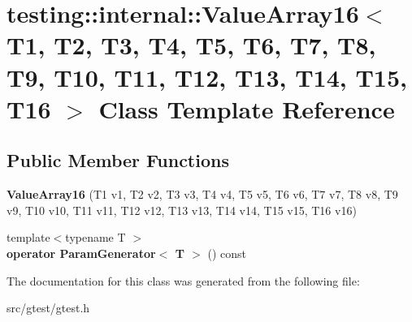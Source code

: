\hypertarget{classtesting_1_1internal_1_1_value_array16}{}\section{testing\+:\+:internal\+:\+:Value\+Array16$<$ T1, T2, T3, T4, T5, T6, T7, T8, T9, T10, T11, T12, T13, T14, T15, T16 $>$ Class Template Reference}
\label{classtesting_1_1internal_1_1_value_array16}
\subsection*{Public Member Functions}
\begin{DoxyCompactItemize}
\item 
\mbox{\label{classtesting_1_1internal_1_1_value_array16_ac12b3a15ab5418665a97b4a225438529}} 
{\bfseries Value\+Array16} (T1 v1, T2 v2, T3 v3, T4 v4, T5 v5, T6 v6, T7 v7, T8 v8, T9 v9, T10 v10, T11 v11, T12 v12, T13 v13, T14 v14, T15 v15, T16 v16)
\item 
\mbox{\label{classtesting_1_1internal_1_1_value_array16_ae4f1174da079ca0d674497f5e452274c}} 
{\footnotesize template$<$typename T $>$ }\\{\bfseries operator Param\+Generator$<$ T $>$} () const
\end{DoxyCompactItemize}


The documentation for this class was generated from the following file\+:\begin{DoxyCompactItemize}
\item 
src/gtest/gtest.\+h\end{DoxyCompactItemize}
